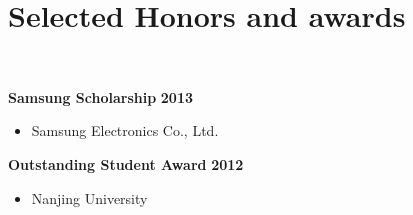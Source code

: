 \documentclass[11pt]{article}
\begin{document}
\vspace{0.8cm}





\vspace{0.8cm}


\vspace{0.8cm}


\section*{\sc Selected Honors and awards}~
\vspace{-.1in}

{\bf Samsung Scholarship}
\hfill
{\bf 2013}
\begin{itemize}
 \item[] Samsung Electronics Co., Ltd.
\end{itemize}

\vspace*{.1in}

{\bf Outstanding Student Award}
\hfill {\bf 2012}
\begin{itemize}
	\item[]  Nanjing University
\end{itemize}

\vspace{0.8cm}


\vspace{0.8cm}




\end{document}
